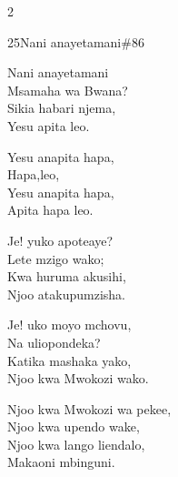 \begin{multicols}{2}
\begin{hymn}{25}{Nani anayetamani}{\#86}
\begin{stanza}
Nani anayetamani\\
Msamaha wa Bwana?\\
Sikia habari njema,\\
Yesu apita leo.
\end{stanza}
\begin{chorus}
Yesu anapita hapa,\\
Hapa,leo,\\
Yesu anapita hapa,\\
Apita hapa leo.
\end{chorus}
\begin{stanza}
Je! yuko apoteaye?\\
Lete mzigo wako;\\
Kwa huruma akusihi,\\
Njoo atakupumzisha.
\end{stanza}
\begin{stanza}
Je! uko moyo mchovu,\\
Na uliopondeka?\\
Katika mashaka yako,\\
Njoo kwa Mwokozi wako.
\end{stanza}
\begin{stanza}
Njoo kwa Mwokozi wa pekee,\\
Njoo kwa upendo wake,\\
Njoo kwa lango liendalo,\\
Makaoni mbinguni.
\end{stanza}
\end{hymn}


\end{multicols}
